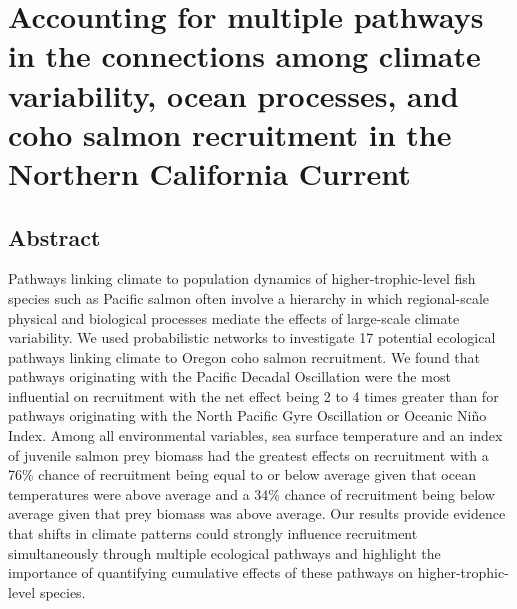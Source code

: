 
\chapter[Quantifying ecological network effects]{Accounting for multiple
pathways in the connections among climate variability, ocean processes, and coho
salmon recruitment in the Northern California Current\footnotemark[1]}



\section{Abstract}

Pathways linking climate to population dynamics of higher-trophic-level fish
species such as Pacific salmon often involve a hierarchy in which regional-scale
physical and biological processes mediate the effects of large-scale climate
variability. We used probabilistic networks to investigate 17 potential
ecological pathways linking climate to Oregon coho salmon recruitment. We found
that pathways originating with the Pacific Decadal Oscillation were the most
influential on recruitment with the net effect being 2 to 4 times greater than
for pathways originating with the North Pacific Gyre Oscillation or Oceanic
Ni\~{n}o
Index. Among all environmental variables, sea surface temperature and an index
of juvenile salmon prey biomass had the greatest effects on recruitment with a
76\% chance of recruitment being equal to or below average given that ocean
temperatures were above average and a 34\% chance of recruitment being below
average given that prey biomass was above average. Our results provide evidence
that shifts in climate patterns could strongly influence recruitment
simultaneously through multiple ecological pathways and highlight the importance
of quantifying cumulative effects of these pathways on higher-trophic-level
species.




